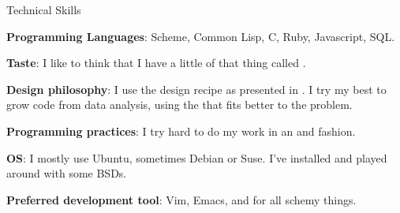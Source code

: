 \begin{rubric}{Technical Skills}{ 

    \entry* \textbf{Programming Languages}: Scheme, Common Lisp, C,
    Ruby, Javascript, SQL.

    \entry* \textbf{Taste}: I like to think that I have a little of that thing
    called .

    \entry* \textbf{Design philosophy}: I use the design recipe as presented in
    . I try my best to grow code
    from data analysis, using the
    that fits better to the problem.

    \entry* \textbf{Programming practices}: I try hard to do my work in an
    and
    fashion.

    \entry* \textbf{OS}: I mostly use Ubuntu, sometimes Debian or Suse. I've
    installed and played around with some BSDs.

    \entry* \textbf{Preferred development tool}: Vim, Emacs, and
    for all schemy things. 

}\end{rubric}
